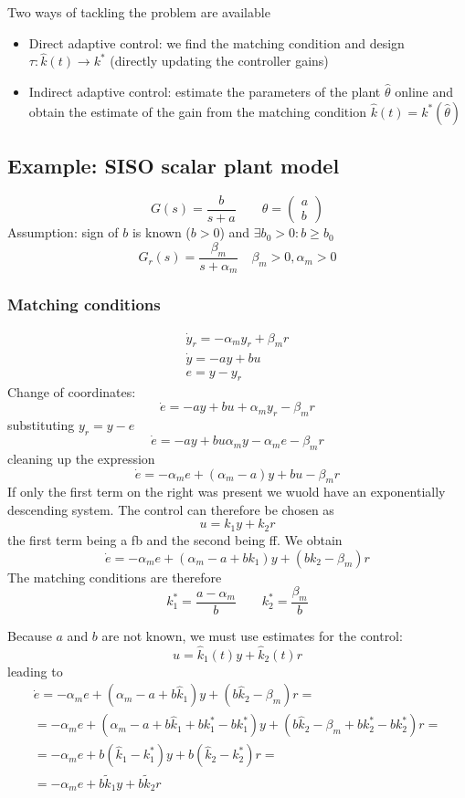 \documentclass{book}
\begin{document}
Two ways of tackling the problem are available 
\begin{itemize}
    \item Direct adaptive control: we find the matching condition and design $\tau: \hat{k}(t)\to k^*$ (directly updating the controller gains)
    \item Indirect adaptive control: estimate the parameters of the plant $\hat{\theta}$ online and obtain the estimate of the gain from the matching condition $\hat{k}(t)=k^*(\hat{\theta})$
\end{itemize}

\subsection{Example: SISO scalar plant model}
\[
    G(s)=\displaystyle\frac{b}{s+a} \qquad \theta=\begin{pmatrix}
        a \\ b
    \end{pmatrix}
\]
Assumption: sign of $b$ is known ($b>0$) and $\exists b_0>0:b\geq b_0$
\[
    G_r(s)=\displaystyle\frac{\beta_m}{s+\alpha_m}\quad \beta_m>0,\alpha_m>0
\]
\subsubsection{Matching conditions }
\begin{gather*}
    \dot{y}_r=-\alpha_my_r+\beta_mr\\
    \dot{y}=-ay+bu\\
    e=y-y_r
\end{gather*}
Change of coordinates: 
\[
    \dot{e}=-ay+bu+\alpha_m y_r- \beta_mr
\]
substituting $y_r=y-e$ 
\[
    \dot{e}=-ay+bu\alpha_my-\alpha_me-\beta_mr
\]
cleaning up the expression 
\[
    \dot{e}=-\alpha_me+(\alpha_m-a)y+bu-\beta_mr
\]
If only the first term on the right was present we wuold have an exponentially descending system. The control can therefore be chosen as 
\[
    u=k_1y+k_2r
\]
the first term being a fb and the second being ff. We obtain 
\[
    \dot{e}=-\alpha_me+(\alpha_m-a+bk_1)y+(bk_2-\beta_m)r
\]
The matching conditions are therefore 
\[
    k_1^* = \displaystyle\frac{a-\alpha_m}{b} \qquad k_2^* = \displaystyle\frac{\beta_m}{b}
\]

Because $a$ and $b$ are not known, we must use estimates for the control:
\[
u=\hat{k}_1(t)y + \hat{k}_2(t)r 
\]
leading to
\begin{gather*}
    \dot{e}=-\alpha_me+(\alpha_m-a+b\hat{k}_1)y+(b\hat{k}_2-\beta_m)r=\\
    =-\alpha_me+(\alpha_m-a+b\hat{k}_1+bk_1^*-bk_1^*)y+(b\hat{k}_2-\beta_m+bk_2^*-bk_2^*)r=\\
    =-\alpha_me+b(\hat{k}_1-k_1^*)y+b(\hat{k}_2-k_2^*)r = \\
    =-\alpha_me+b\tilde{k}_1y + b\tilde{k}_2r
\end{gather*}
\end{document}
